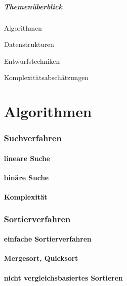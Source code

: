 \documentclass{beamer}
\subtitle{Themenüberblick}
\begin{document}
\maketitle

\begin{frame}
\frametitle{Themenüberblick}
\begin{block}{Algorithmen}\end{block}
\begin{block}{Datenstrukturen}\end{block}
\begin{block}{Entwurfstechniken}\end{block}
\begin{block}{Komplexitätsabschätzungen}\end{block}
\end{frame}

\part{Algorithmen}

\section{Suchverfahren}
\subsection{lineare Suche}
\subsection{binäre Suche}
\subsection{Komplexität}

\section{Sortierverfahren}
\subsection{einfache Sortierverfahren}
\subsection{Mergesort, Quicksort}
\subsection{nicht vergleichsbasiertes Sortieren}
\end{document}
